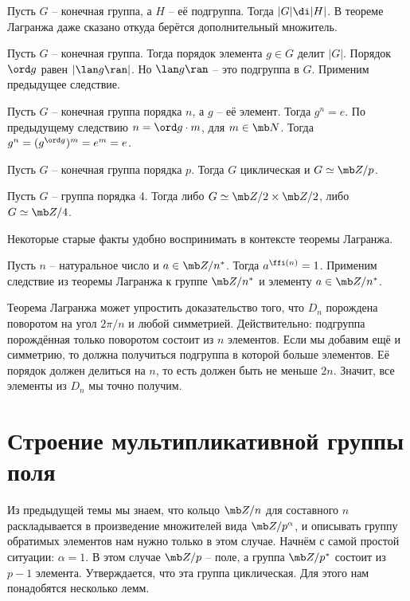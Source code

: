 \crl Пусть $G$ -- конечная группа, а $H$ -- её подгруппа. Тогда $|G| \di |H|$.
\ecrl
\proof В теореме Лагранжа даже сказано откуда берётся дополнительный множитель.
\endproof

\crl Пусть $G$ -- конечная группа. Тогда порядок элемента $g\in G$ делит $|G|$.
\ecrl
\proof Порядок $\ord g$ равен $|\lan g\ran|$. Но $\lan g\ran$ -- это подгруппа в $G$. Применим предыдущее следствие.
\endproof

\crl Пусть $G$ -- конечная группа порядка $n$, а $g$ -- её элемент. Тогда $g^n=e$.
\ecrl  
\proof По предыдущему следствию $n= \ord g \cdot m$, для $m\in \mb N$. Тогда $g^n=(g^{\ord g})^m=e^m=e$. 
\endproof

\crl Пусть $G$ -- конечная группа порядка $p$. Тогда $G$ циклическая и $G \simeq \mb Z/p$. 
\ecrl

\crl Пусть $G$ -- группа порядка $4$. Тогда либо $G \simeq \mb Z/2 \times \mb Z/2$, либо $G \simeq \mb Z/4$.
\ecrl



Некоторые старые факты удобно воспринимать в контексте теоремы Лагранжа.


 Пусть $n$ -- натуральное число и $a\in \mb Z/n^*$. Тогда $a^{\ffi(n)}=1$.
\ecrl
\proof
Применим следствие из теоремы Лагранжа к группе $\mb Z/n^*$ и элементу $a\in \mb Z/n^*$.
\endproof

\rm Теорема Лагранжа может упростить доказательство того, что $D_n$ порождена поворотом на угол $2\pi/n$ и любой симметрией. Действительно: подгруппа порождённая только поворотом состоит из $n$ элементов. Если мы добавим ещё и симметрию, то должна получиться подгруппа в которой больше элементов. Её порядок должен делиться на $n$, то  есть должен быть не меньше $2n$. Значит, все элементы из $D_n$ мы точно получим.
\erm 




\section{Строение мультипликативной группы поля}


Из предыдущей темы мы знаем, что кольцо $\mb Z/n$ для составного $n$ раскладывается в произведение множителей вида $\mb Z/p^{\alpha}$, и описывать группу обратимых элементов нам нужно только в этом случае. Начнём с самой простой ситуации: $\alpha=1$. В этом случае $\mb Z/p$ -- поле, а группа $\mb Z/p^*$ состоит из $p-1$ элемента. Утверждается, что эта группа циклическая. Для этого нам понадобятся несколько лемм. 


